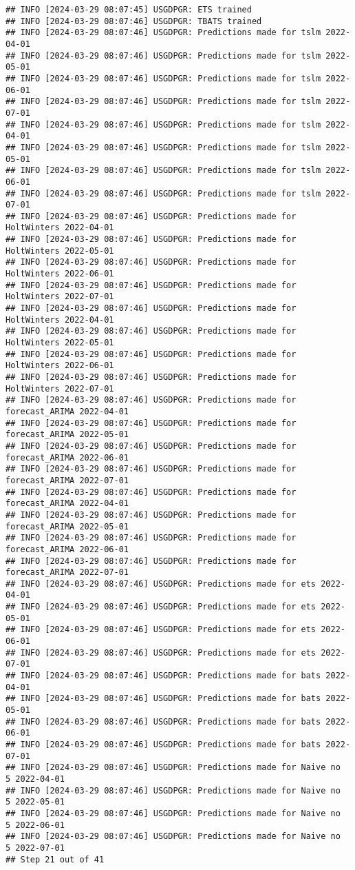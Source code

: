 \documentclass[
]{article}
\begin{document}
\begin{verbatim}
## INFO [2024-03-29 08:07:45] USGDPGR: ETS trained
## INFO [2024-03-29 08:07:46] USGDPGR: TBATS trained
## INFO [2024-03-29 08:07:46] USGDPGR: Predictions made for tslm 2022-04-01
## INFO [2024-03-29 08:07:46] USGDPGR: Predictions made for tslm 2022-05-01
## INFO [2024-03-29 08:07:46] USGDPGR: Predictions made for tslm 2022-06-01
## INFO [2024-03-29 08:07:46] USGDPGR: Predictions made for tslm 2022-07-01
## INFO [2024-03-29 08:07:46] USGDPGR: Predictions made for tslm 2022-04-01
## INFO [2024-03-29 08:07:46] USGDPGR: Predictions made for tslm 2022-05-01
## INFO [2024-03-29 08:07:46] USGDPGR: Predictions made for tslm 2022-06-01
## INFO [2024-03-29 08:07:46] USGDPGR: Predictions made for tslm 2022-07-01
## INFO [2024-03-29 08:07:46] USGDPGR: Predictions made for HoltWinters 2022-04-01
## INFO [2024-03-29 08:07:46] USGDPGR: Predictions made for HoltWinters 2022-05-01
## INFO [2024-03-29 08:07:46] USGDPGR: Predictions made for HoltWinters 2022-06-01
## INFO [2024-03-29 08:07:46] USGDPGR: Predictions made for HoltWinters 2022-07-01
## INFO [2024-03-29 08:07:46] USGDPGR: Predictions made for HoltWinters 2022-04-01
## INFO [2024-03-29 08:07:46] USGDPGR: Predictions made for HoltWinters 2022-05-01
## INFO [2024-03-29 08:07:46] USGDPGR: Predictions made for HoltWinters 2022-06-01
## INFO [2024-03-29 08:07:46] USGDPGR: Predictions made for HoltWinters 2022-07-01
## INFO [2024-03-29 08:07:46] USGDPGR: Predictions made for forecast_ARIMA 2022-04-01
## INFO [2024-03-29 08:07:46] USGDPGR: Predictions made for forecast_ARIMA 2022-05-01
## INFO [2024-03-29 08:07:46] USGDPGR: Predictions made for forecast_ARIMA 2022-06-01
## INFO [2024-03-29 08:07:46] USGDPGR: Predictions made for forecast_ARIMA 2022-07-01
## INFO [2024-03-29 08:07:46] USGDPGR: Predictions made for forecast_ARIMA 2022-04-01
## INFO [2024-03-29 08:07:46] USGDPGR: Predictions made for forecast_ARIMA 2022-05-01
## INFO [2024-03-29 08:07:46] USGDPGR: Predictions made for forecast_ARIMA 2022-06-01
## INFO [2024-03-29 08:07:46] USGDPGR: Predictions made for forecast_ARIMA 2022-07-01
## INFO [2024-03-29 08:07:46] USGDPGR: Predictions made for ets 2022-04-01
## INFO [2024-03-29 08:07:46] USGDPGR: Predictions made for ets 2022-05-01
## INFO [2024-03-29 08:07:46] USGDPGR: Predictions made for ets 2022-06-01
## INFO [2024-03-29 08:07:46] USGDPGR: Predictions made for ets 2022-07-01
## INFO [2024-03-29 08:07:46] USGDPGR: Predictions made for bats 2022-04-01
## INFO [2024-03-29 08:07:46] USGDPGR: Predictions made for bats 2022-05-01
## INFO [2024-03-29 08:07:46] USGDPGR: Predictions made for bats 2022-06-01
## INFO [2024-03-29 08:07:46] USGDPGR: Predictions made for bats 2022-07-01
## INFO [2024-03-29 08:07:46] USGDPGR: Predictions made for Naive no  5 2022-04-01
## INFO [2024-03-29 08:07:46] USGDPGR: Predictions made for Naive no  5 2022-05-01
## INFO [2024-03-29 08:07:46] USGDPGR: Predictions made for Naive no  5 2022-06-01
## INFO [2024-03-29 08:07:46] USGDPGR: Predictions made for Naive no  5 2022-07-01
## Step 21 out of 41
\end{verbatim}
\end{document}
